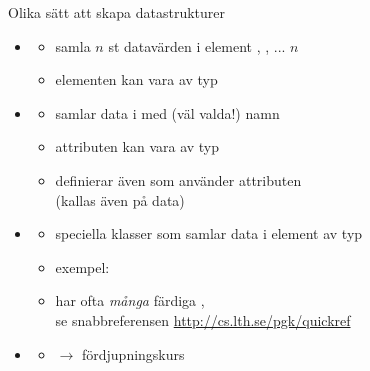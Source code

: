 \begin{Slide}{Olika sätt att skapa datastrukturer}
\begin{itemize}
\item {} 
  \begin{itemize}
  \item samla $n$ st datavärden i element , , ...  \code{_}$n$
  \item elementen kan vara av  typ
  \end{itemize}
\item {} 
  \begin{itemize}
  \item samlar data i  med (väl valda!) namn
  \item attributen kan vara av  typ
  \item definierar även  som använder attributen \\ (kallas även  på data)
  \end{itemize}

\item {}
  \begin{itemize}
  \item speciella klasser som samlar data i element av  typ
  \item exempel: 
  \item har ofta \emph{många} färdiga , \\ se snabbreferensen \url{http://cs.lth.se/pgk/quickref}
  \end{itemize}

\item {}
  \begin{itemize}
  \item $\rightarrow$ fördjupningskurs
  \end{itemize}

\end{itemize}
\end{Slide}






